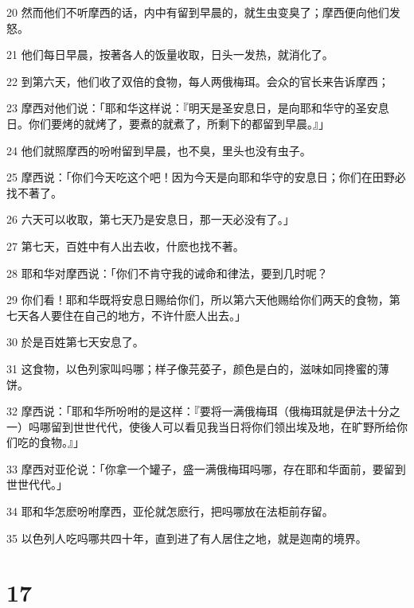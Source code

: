 \par 20 然而他们不听摩西的话，内中有留到早晨的，就生虫变臭了；摩西便向他们发怒。
\par 21 他们每日早晨，按著各人的饭量收取，日头一发热，就消化了。
\par 22 到第六天，他们收了双倍的食物，每人两俄梅珥。会众的官长来告诉摩西；
\par 23 摩西对他们说：「耶和华这样说：『明天是圣安息日，是向耶和华守的圣安息日。你们要烤的就烤了，要煮的就煮了，所剩下的都留到早晨。』」
\par 24 他们就照摩西的吩咐留到早晨，也不臭，里头也没有虫子。
\par 25 摩西说：「你们今天吃这个吧！因为今天是向耶和华守的安息日；你们在田野必找不著了。
\par 26 六天可以收取，第七天乃是安息日，那一天必没有了。」
\par 27 第七天，百姓中有人出去收，什麽也找不著。
\par 28 耶和华对摩西说：「你们不肯守我的诫命和律法，要到几时呢？
\par 29 你们看！耶和华既将安息日赐给你们，所以第六天他赐给你们两天的食物，第七天各人要住在自己的地方，不许什麽人出去。」
\par 30 於是百姓第七天安息了。
\par 31 这食物，以色列家叫吗哪；样子像芫荽子，颜色是白的，滋味如同搀蜜的薄饼。
\par 32 摩西说：「耶和华所吩咐的是这样：『要将一满俄梅珥（俄梅珥就是伊法十分之一）吗哪留到世世代代，使後人可以看见我当日将你们领出埃及地，在旷野所给你们吃的食物。』」
\par 33 摩西对亚伦说：「你拿一个罐子，盛一满俄梅珥吗哪，存在耶和华面前，要留到世世代代。」
\par 34 耶和华怎麽吩咐摩西，亚伦就怎麽行，把吗哪放在法柜前存留。
\par 35 以色列人吃吗哪共四十年，直到进了有人居住之地，就是迦南的境界。

\chapter{17}


